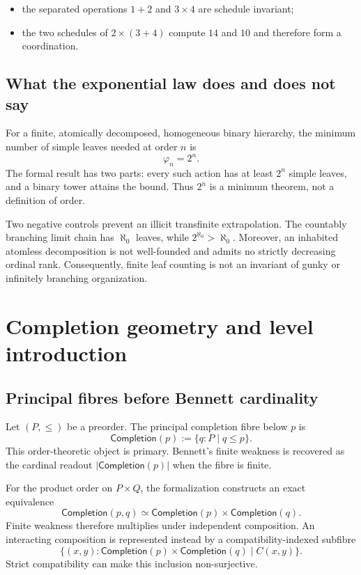 \documentclass[11pt]{article}
\theoremstyle{remark}
\newcommand{\Comp}{\mathsf{Completion}}
\begin{document}
\begin{itemize}
  \item the separated operations $1+2$ and $3\times4$ are schedule invariant;
  \item the two schedules of $2\times(3+4)$ compute $14$ and $10$ and therefore
        form a coordination.
\end{itemize}

\subsection{What the exponential law does and does not say}

For a finite, atomically decomposed, homogeneous binary hierarchy, the minimum
number of simple leaves needed at order $n$ is
\[
  \varphi_n = 2^n.
\]
The formal result has two parts: every such action has at least $2^n$ simple
leaves, and a binary tower attains the bound.  Thus $2^n$ is a minimum theorem,
not a definition of order.

Two negative controls prevent an illicit transfinite extrapolation.  The
countably branching limit chain has $\aleph_0$ leaves, while
$2^{\aleph_0}>\aleph_0$.  Moreover, an inhabited atomless decomposition is not
well-founded and admits no strictly decreasing ordinal rank.  Consequently,
finite leaf counting is not an invariant of gunky or infinitely branching
organization.

\section{Completion geometry and level introduction}

\subsection{Principal fibres before Bennett cardinality}

Let $(P,\leq)$ be a preorder.  The principal completion fibre below $p$ is
\[
  \Comp(p) := \{q:P\mid q\leq p\}.
\]
This order-theoretic object is primary.  Bennett's finite weakness is recovered
as the cardinal readout $|\Comp(p)|$ when the fibre is finite.

For the product order on $P\times Q$, the formalization constructs an exact
equivalence
\[
  \Comp(p,q) \simeq \Comp(p)\times\Comp(q).
\]
Finite weakness therefore multiplies under independent composition.  An
interacting composition is represented instead by a compatibility-indexed
subfibre
\[
  \{(x,y):\Comp(p)\times\Comp(q)\mid C(x,y)\}.
\]
Strict compatibility can make this inclusion non-surjective.
\end{document}
